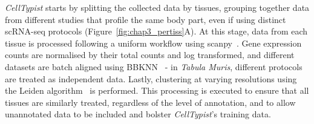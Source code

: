 \textit{CellTypist} starts by splitting the collected data by tissues, grouping together data from different studies that profile the same body part, even if using distinct scRNA-seq protocols (Figure~\ref{fig:chap3_pertiss}A). At this stage, data from each tissue is processed following a uniform workflow using scanpy~\citep{wolf_scanpy:_2018}. Gene expression counts are normalised by their total counts and log transformed, and different datasets are batch aligned using BBKNN~\citep{polanski_bbknn:_2019} - in \textit{Tabula Muris}, different protocols are treated as independent data. Lastly, clustering at varying resolutions using the Leiden algorithm~\citep{traag_louvain_2019} is performed. This processing is executed to ensure that all tissues are similarly treated, regardless of the level of annotation, and to allow unannotated data to be included and bolster \textit{CellTypist}'s training data.

